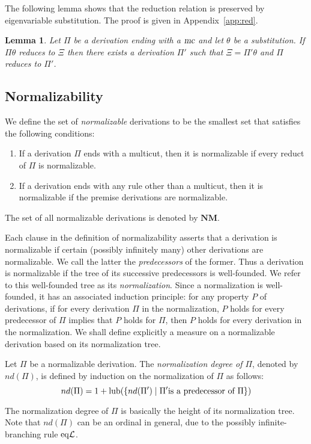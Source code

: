 \documentclass[preprint]{elsarticle}
\newcommand{\eqL}{{\rm eq}{\cal L}}
\newcommand{\lub}[1]{{\rm lub}(#1)}
\newcommand{\mc}{\hbox{\sl mc}}
\def\NM{{\mathbf{NM}}}
\newtheorem{lemma}[thm]{Lemma}
\begin{document}
The following lemma shows that the reduction relation is preserved by
eigenvariable substitution. The proof is given in Appendix~\ref{app:red}.

\begin{lemma}
  \label{lm:reduct_subst}
  Let $\Pi$ be a derivation ending with a $\mc$
  and let $\theta$ be a substitution.  If $\Pi\theta$ reduces to $\Xi$
  then there exists a derivation $\Pi'$ such that $\Xi = \Pi'\theta$
  and $\Pi$ reduces to $\Pi'$.
\end{lemma}



\subsection{Normalizability}
\label{sec:norm}

\begin{definition}
  \label{def:norm}
  We define the set of \emph{normalizable} derivations to be the
  smallest set that satisfies the following conditions:
  \begin{enumerate}
  \item If a derivation $\Pi$ ends with a multicut, then it is
    normalizable if every reduct of $\Pi$ is normalizable.
  \item If a derivation ends with any rule other than a multicut, then
    it is normalizable if the premise derivations are normalizable.
  \end{enumerate}
\end{definition}
The set of all normalizable derivations is denoted by $\NM$.

Each clause in the definition of normalizability asserts that a
derivation is normalizable if certain (possibly infinitely many) other
derivations are normalizable. We call the latter the
\emph{predecessors} of the former.  Thus a derivation is normalizable
if the tree of its successive predecessors is well-founded.  We refer
to this well-founded tree as its \emph{normalization}.  Since a
normalization is well-founded, it has an associated induction
principle: for any property $P$ of derivations, if for every
derivation $\Pi$ in the normalization, $P$ holds for every predecessor
of $\Pi$ implies that $P$ holds for $\Pi$, then $P$ holds for every
derivation in the normalization.  We shall define explicitly a measure
on a normalizable derivation based on its normalization tree.

\begin{definition}
  \label{def:deg-norm}
  Let $\Pi$ be a normalizable derivation. The \emph{normalization
    degree of $\Pi$}, denoted by $nd(\Pi)$, is defined by induction on
  the normalization of $\Pi$ as follows:
$$
nd(\Pi) = 1 + \lub {\{nd(\Pi') \mid \Pi' \hbox{is a predecessor of
    $\Pi$}\}}
$$
\end{definition}
The normalization degree of $\Pi$ is basically the height of its
normalization tree. Note that $nd(\Pi)$ can be an ordinal in general,
due to the possibly infinite-branching rule $\eqL$.
\end{document}
